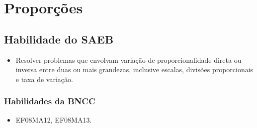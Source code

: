 














\chapter{Proporções}

\section*{Habilidade do SAEB}

\begin{itemize}
\item Resolver problemas que envolvam variação de
proporcionalidade direta ou inversa entre duas ou mais grandezas,
inclusive escalas, divisões proporcionais e taxa de variação.
\end{itemize}

\subsection{Habilidades da BNCC}

\begin{itemize}
\item EF08MA12, EF08MA13.
\end{itemize}

